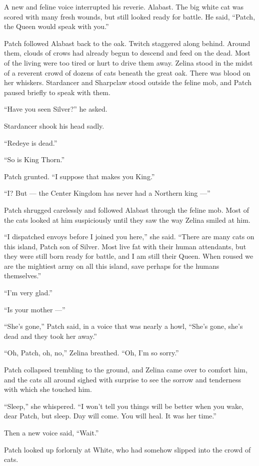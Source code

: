 \documentclass[ebook,oneside,openany,12pt]{memoir}
\begin{document}
A new and feline voice interrupted his reverie. Alabast. The big white
cat was scored with many fresh wounds, but still looked ready for
battle. He said, “Patch, the Queen would speak with you.”

Patch followed Alabast back to the oak. Twitch staggered along
behind. Around them, clouds of crows had already begun to descend and
feed on the dead. Most of the living were too tired or hurt to drive
them away. Zelina stood in the midst of a reverent crowd of dozens of
cats beneath the great oak. There was blood on her
whiskers. Stardancer and Sharpclaw stood outside the feline mob, and
Patch paused briefly to speak with them.

“Have you seen Silver?” he asked.

Stardancer shook his head sadly.

“Redeye is dead.”

“So is King Thorn.”

Patch grunted. “I suppose that makes you King.”

“I? But — the Center Kingdom has never had a Northern king —”

Patch shrugged carelessly and followed Alabast through the feline
mob. Most of the cats looked at him suspiciously until they saw the
way Zelina smiled at him.

“I dispatched envoys before I joined you here,” she said. “There are
many cats on this island, Patch son of Silver. Most live fat with
their human attendants, but they were still born ready for battle, and
I am still their Queen. When roused we are the mightiest army on all
this island, save perhaps for the humans themselves.”

“I’m very glad.”

“Is your mother —”

“She’s gone,” Patch said, in a voice that was nearly a howl, “She’s
gone, she’s dead and they took her away.”

“Oh, Patch, oh, no,” Zelina breathed. “Oh, I’m so sorry.”

Patch collapsed trembling to the ground, and Zelina came over to
comfort him, and the cats all around sighed with surprise to see the
sorrow and tenderness with which she touched him.

“Sleep,” she whispered. “I won’t tell you things will be better when
you wake, dear Patch, but sleep. Day will come. You will heal. It was
her time.”

Then a new voice said, “Wait.”

Patch looked up forlornly at White, who had somehow slipped into the
crowd of cats.
\end{document}
